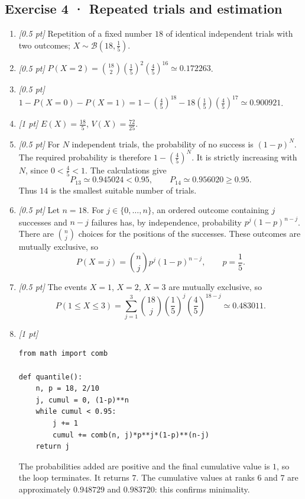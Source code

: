 \subsection*{Exercise 4 · Repeated trials and estimation}\begin{enumerate}

\item \textit{[0.5 pt]} Repetition of a fixed number $18$ of identical independent trials with two outcomes; $X\sim\mathcal B(18,\frac{1}{5})$.

\item \textit{[0.5 pt]} $P(X=2)=\binom{18}2(\frac{1}{5})^2(\frac{4}{5})^{16}\simeq\num{0,172263}$.

\item \textit{[0.5 pt]} $1-P(X=0)-P(X=1)=1-(\frac{4}{5})^{18}-18(\frac{1}{5})(\frac{4}{5})^{17}\simeq\num{0,900921}$.

\item \textit{[1 pt]} $E(X)=\frac{18}{5}$, $V(X)=\frac{72}{25}$.

\item \textit{[0.5 pt]} For $N$ independent trials, the probability of no success is $(1-p)^N$. The required probability is therefore $1-(\frac{4}{5})^N$. It is strictly increasing with $N$, since $0<\frac{4}{5}<1$. The calculations give
\[P_{13}\simeq\num{0,945024}<\num{0,95},\qquad P_{14}\simeq\num{0,956020}\ge\num{0,95}.\]
Thus $14$ is the smallest suitable number of trials.

\item \textit{[0.5 pt]} Let $n=18$. For $j\in\{0,\ldots,n\}$, an ordered outcome containing $j$ successes and $n-j$ failures has, by independence, probability $p^j(1-p)^{n-j}$. There are $\binom nj$ choices for the positions of the successes. These outcomes are mutually exclusive, so
\[P(X=j)=\binom nj p^j(1-p)^{n-j},\qquad p=\frac{1}{5}.\]

\item \textit{[0.5 pt]} The events $X=1$, $X=2$, $X=3$ are mutually exclusive, so
\[P(1\le X\le3)=\sum_{j=1}^3\binom{18}j(\frac{1}{5})^j(\frac{4}{5})^{18-j}\simeq\num{0,483011}.\]


\item \textit{[1 pt]} 
\begin{lstlisting}
from math import comb

def quantile():
    n, p = 18, 2/10
    j, cumul = 0, (1-p)**n
    while cumul < 0.95:
        j += 1
        cumul += comb(n, j)*p**j*(1-p)**(n-j)
    return j
\end{lstlisting}
The probabilities added are positive and the final cumulative value is $1$, so the loop terminates. It returns $7$. The cumulative values at ranks $6$ and $7$ are approximately $\num{0,948729}$ and $\num{0,983720}$: this confirms minimality.

\end{enumerate}

